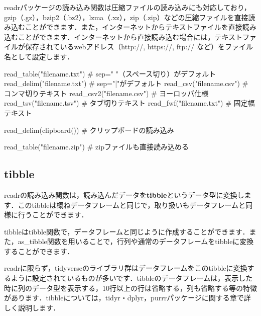 \documentclass[
  letterpaper,
  DIV=11,
  numbers=noendperiod]{scrreprt}
\newenvironment{Shaded}{\begin{snugshade}}{\end{snugshade}}
\newcommand{\CommentTok}[1]{\textcolor[rgb]{0.37,0.37,0.37}{#1}}
\newcommand{\FunctionTok}[1]{\textcolor[rgb]{0.28,0.35,0.67}{#1}}
\newcommand{\NormalTok}[1]{\textcolor[rgb]{0.00,0.23,0.31}{#1}}
\newcommand{\StringTok}[1]{\textcolor[rgb]{0.13,0.47,0.30}{#1}}
\begin{document}
readrパッケージの読み込み関数は圧縮ファイルの読み込みにも対応しており，gzip（.gz），bzip2（.bz2），lzma（.xz），zip（.zip）などの圧縮ファイルを直接読み込むことができます．また，インターネットからテキストファイルを直接読み込むことができます．インターネットから直接読み込む場合には，テキストファイルが保存されているwebアドレス（http://,
https://, ftp:// など）をファイル名として設定します．

\begin{Shaded}
\begin{Highlighting}[]
\FunctionTok{read\_table}\NormalTok{(}\StringTok{"filename.txt"}\NormalTok{) }\CommentTok{\# sep=" "（スペース切り）がデフォルト}
\FunctionTok{read\_delim}\NormalTok{(}\StringTok{"filename.txt"}\NormalTok{) }\CommentTok{\# sep="|"がデフォルト}
\FunctionTok{read\_csv}\NormalTok{(}\StringTok{"filename.csv"}\NormalTok{) }\CommentTok{\# コンマ切りテキスト}
\FunctionTok{read\_csv2}\NormalTok{(}\StringTok{"filename.csv"}\NormalTok{) }\CommentTok{\# ヨーロッパ仕様}
\FunctionTok{read\_tsv}\NormalTok{(}\StringTok{"filename.tsv"}\NormalTok{) }\CommentTok{\# タブ切りテキスト}
\FunctionTok{read\_fwf}\NormalTok{(}\StringTok{"filename.txt"}\NormalTok{) }\CommentTok{\# 固定幅テキスト}

\FunctionTok{read\_delim}\NormalTok{(}\FunctionTok{clipboard}\NormalTok{()) }\CommentTok{\# クリップボードの読み込み}

\FunctionTok{read\_table}\NormalTok{(}\StringTok{"filename.zip"}\NormalTok{) }\CommentTok{\# zipファイルも直接読み込める}
\end{Highlighting}
\end{Shaded}

\hypertarget{tibble}{%
\subsection{tibble}\label{tibble}}

readrの読み込み関数は，読み込んだデータを\textbf{tibble}というデータ型に変換します．このtibbleは概ねデータフレームと同じで，取り扱いもデータフレームと同様に行うことができます．

tibbleはtibble関数で，データフレームと同じように作成することができます．また，as\_tibble関数を用いることで，行列や通常のデータフレームをtibbleに変換することができます．

readrに限らず，tidyverseのライブラリ群はデータフレームをこのtibbleに変換するように設定されているものが多いです．tibbleのデータフレームは，表示した時に列のデータ型を表示する，10行以上の行は省略する，列も省略する等の特徴があります．tibbleについては，tidyr・dplyr，purrrパッケージに関する章で詳しく説明します．
\end{document}
